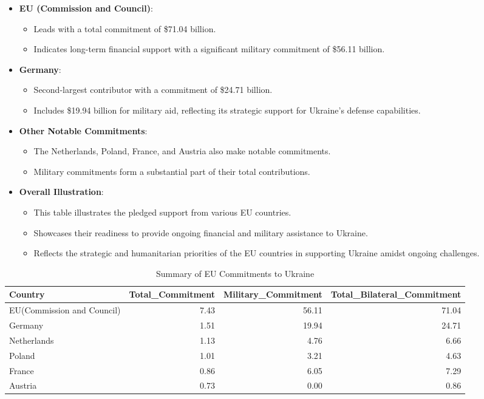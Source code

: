\documentclass[12pt,preprint, authoryear]{elsarticle}
\numberwithin{equation}{section}
\numberwithin{figure}{section}
\numberwithin{table}{section}
\def\tightlist{} %
\begin{document}
\begin{itemize}
\tightlist
\item
  \textbf{EU (Commission and Council)}:

  \begin{itemize}
  \tightlist
  \item
    Leads with a total commitment of \$71.04 billion.
  \item
    Indicates long-term financial support with a significant military
    commitment of \$56.11 billion.
  \end{itemize}
\item
  \textbf{Germany}:

  \begin{itemize}
  \tightlist
  \item
    Second-largest contributor with a commitment of \$24.71 billion.
  \item
    Includes \$19.94 billion for military aid, reflecting its strategic
    support for Ukraine's defense capabilities.
  \end{itemize}
\item
  \textbf{Other Notable Commitments}:

  \begin{itemize}
  \tightlist
  \item
    The Netherlands, Poland, France, and Austria also make notable
    commitments.
  \item
    Military commitments form a substantial part of their total
    contributions.
  \end{itemize}
\item
  \textbf{Overall Illustration}:

  \begin{itemize}
  \tightlist
  \item
    This table illustrates the pledged support from various EU
    countries.
  \item
    Showcases their readiness to provide ongoing financial and military
    assistance to Ukraine.
  \item
    Reflects the strategic and humanitarian priorities of the EU
    countries in supporting Ukraine amidst ongoing challenges.
  \end{itemize}
\end{itemize}

\begingroup\fontsize{11pt}{12pt}\selectfont
\begin{longtable}{lrrr}
\caption{Summary of EU Commitments to Ukraine \label{tab2}} \\ 
  \toprule
Country & Total\_Commitment & Military\_Commitment & Total\_Bilateral\_Commitment \\ 
  \midrule
EU(Commission and Council) & 7.43 & 56.11 & 71.04 \\ 
  Germany & 1.51 & 19.94 & 24.71 \\ 
  Netherlands & 1.13 & 4.76 & 6.66 \\ 
  Poland & 1.01 & 3.21 & 4.63 \\ 
  France & 0.86 & 6.05 & 7.29 \\ 
  Austria & 0.73 & 0.00 & 0.86 \\ 
   \bottomrule
\end{longtable}
\endgroup
\end{document}
